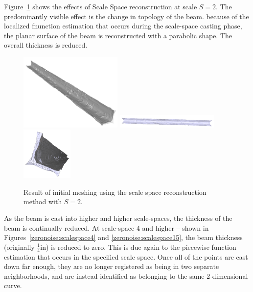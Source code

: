\documentclass[12pt]{drexelthesis}
\begin{document}
Figure~\ref{zeronoise:scalespace2} shows the effects of Scale Space reconstruction at scale $S = 2$. The predominantly visible effect is the change in topology of the beam. because of the localized fnunction estimation that occurs during the scale-space casting phase, the planar surface of the beam is reconstructed with a parabolic shape. The overall thickness is reduced.

\begin{figure}[!ht]
	\centering
		\includegraphics[width=2in]{simulated-lab-scan/0noise/clean/scale200.png}
		\includegraphics[width=2in]{simulated-lab-scan/0noise/clean/scalespace201.png}
		\includegraphics[width=1in]{simulated-lab-scan/0noise/clean/scalespace202.png}
		\caption[Initial meshing using a scale space reconstruction with $S = 2$]{\centering  Result of initial meshing using the scale space reconstruction method with $S = 2$.}
	\label{zeronoise:scalespace2}
\end{figure}

As the beam is cast into higher and higher scale-spaces, the thickness of the beam is continually reduced. At scale-space 4 and higher -- shown in Figures~\ref{zeronoise:scalespace4} and \ref{zeronoise:scalespace15}, the beam thickness (originally $\frac{1}{4}$in) is reduced to zero. This is due again to the piecewise function estimation that occurs in the specified scale space. Once all of the points are cast down far enough, they are no longer registered as being in two separate neighborhoods, and are instead identified as belonging to the same 2-dimensional curve.
\end{document}
